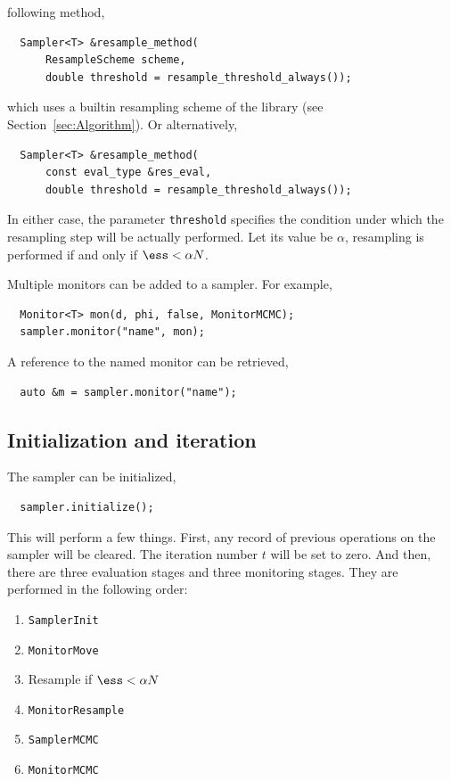 following method,
\begin{Verbatim}
  Sampler<T> &resample_method(
      ResampleScheme scheme,
      double threshold = resample_threshold_always());
\end{Verbatim}
which uses a builtin resampling scheme of the library (see
Section~\ref{sec:Algorithm}). Or alternatively,
\begin{Verbatim}
  Sampler<T> &resample_method(
      const eval_type &res_eval,
      double threshold = resample_threshold_always());
\end{Verbatim}
In either case, the parameter \verb|threshold| specifies the condition under
which the resampling step will be actually performed. Let its value be
$\alpha$, resampling is performed if and only if $\ess < \alpha N$.

Multiple monitors can be added to a sampler. For example,
\begin{Verbatim}
  Monitor<T> mon(d, phi, false, MonitorMCMC);
  sampler.monitor("name", mon);
\end{Verbatim}
A reference to the named monitor can be retrieved,
\begin{Verbatim}
  auto &m = sampler.monitor("name");
\end{Verbatim}

\subsection{Initialization and iteration}
\label{sub:Initialization and iteration}

The sampler can be initialized,
\begin{Verbatim}
  sampler.initialize();
\end{Verbatim}
This will perform a few things. First, any record of previous operations on the
sampler will be cleared. The iteration number $t$ will be set to zero. And
then, there are three evaluation stages and three monitoring stages. They are
performed in the following order:

\begin{enumerate}
  \item \verb|SamplerInit|
  \item \verb|MonitorMove|
  \item Resample if $\ess < \alpha N$
  \item \verb|MonitorResample|
  \item \verb|SamplerMCMC|
  \item \verb|MonitorMCMC|
\end{enumerate}

